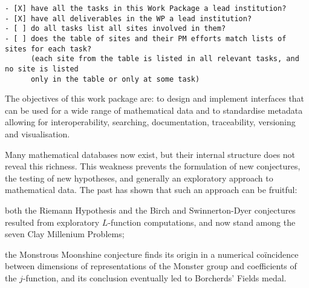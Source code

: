 \begin{draft}
\begin{verbatim}
- [X] have all the tasks in this Work Package a lead institution?
- [X] have all deliverables in the WP a lead institution?
- [ ] do all tasks list all sites involved in them? 
- [ ] does the table of sites and their PM efforts match lists of sites for each task?
      (each site from the table is listed in all relevant tasks, and no site is listed
      only in the table or only at some task)
\end{verbatim}
\end{draft}



\begin{workpackage}[id=dksbases,wphases=1-48!.5,
  title=Data/Knowledge/Software-Bases,lead=JU,
  ZHRM=12,JURM=36,USHRM=12,UWRM=25,SARM=10,LLRM=2,PSRM=4]


\begin{wpobjectives}
  The objectives of this work package are: to design and implement interfaces that can be
  used for a wide range of mathematical data and to standardise metadata allowing for
  interoperability, searching, documentation, traceability, versioning and visualisation.
\end{wpobjectives}

\begin{wpdescription}
  Many mathematical databases now exist, but their internal structure does not reveal this
  richness. This weakness prevents the formulation of new conjectures, the testing of new
  hypotheses, and generally an exploratory approach to mathematical data. The past has
  shown that such an approach can be fruitful:
  \begin{compactitem}
  \item both the Riemann Hypothesis and the Birch and Swinnerton-Dyer conjectures resulted
    from exploratory $L$-function computations, and now stand among the seven Clay
    Millenium Problems;
  \item the Monstrous Moonshine conjecture finds its origin in a numerical co\"incidence
    between dimensions of representations of the Monster group and coefficients of the
    $j$-function, and its conclusion eventually led to Borcherds' Fields medal.
  \end{compactitem}


\end{wpdescription}
\end{workpackage}
